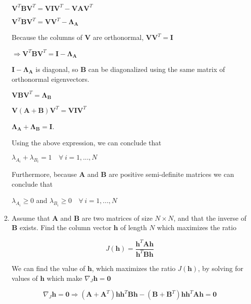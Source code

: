 \documentclass[fleqn]{article}
\begin{document}
\begin{enumerate}
		$\mathbf{V}^T\mathbf{B}\mathbf{V}^T = \mathbf{V}\mathbf{I}\mathbf{V}^T - \mathbf{V}\mathbf{A}\mathbf{V}^T$
		
		$\mathbf{V}^T\mathbf{B}\mathbf{V}^T = \mathbf{V}\mathbf{V}^T - \mathbf{\Lambda_A}$
		
		Because the columns of $\mathbf{V}$ are orthonormal, $\mathbf{V}\mathbf{V}^T = \mathbf{I}$
		
		$\Rightarrow \mathbf{V}^T\mathbf{B}\mathbf{V}^T = \mathbf{I} - \mathbf{\Lambda_A}$
		
		$\mathbf{I} - \mathbf{\Lambda_A}$ is diagonal, so $\mathbf{B}$ can be diagonalized using the same matrix of orthonormal eigenvectors.
		
		$\mathbf{V}\mathbf{B}\mathbf{V}^T = \mathbf{\Lambda_B}$		
		
		$\mathbf{V}(\mathbf{A} + \mathbf{B})\mathbf{V}^T = \mathbf{V}\mathbf{I}\mathbf{V}^T$
		
		$\mathbf{\Lambda_A} + \mathbf{\Lambda_B} = \mathbf{I}$.
		
		Using the above expression, we can conclude that
		
		$\lambda_{A_i} + \lambda_{B_i} = 1\quad \forall\ i = 1,...,N$
		
		Furthermore, because $\mathbf{A}$ and $\mathbf{B}$ are positive semi-definite matrices we can conclude that
		
		$\lambda_{A_i} \geq 0$ and $\lambda_{B_i} \geq 0\quad \forall\ i = 1,...,N$
		
		\item Assume that $\mathbf{A}$ and $\mathbf{B}$ are two matrices of size $N \times N$, and that the inverse of $\mathbf{B}$ exists. Find the column vector $\mathbf{h}$ of length $N$ which maximizes the ratio
		
		\begin{equation*}
			J(\mathbf{h}) = \frac{\mathbf{h}^T\mathbf{A}\mathbf{h}}{\mathbf{h}^T\mathbf{B}\mathbf{h}}
		\end{equation*}
		
		We can find the value of $\mathbf{h}$, which maximizes the ratio $J(\mathbf{h})$, by solving for values of $\mathbf{h}$ which make $\nabla_J\mathbf{h} = \mathbf{0}$ 
		
		\begin{equation*}
			\nabla_J\mathbf{h} = \mathbf{0} \Rightarrow (\mathbf{A} + \mathbf{A}^T)\mathbf{h}\mathbf{h}^T\mathbf{B}\mathbf{h} - (\mathbf{B} + \mathbf{B}^T)\mathbf{h}\mathbf{h}^T\mathbf{A}\mathbf{h} = \mathbf{0}
		\end{equation*}
		

\end{enumerate}
\end{document}
